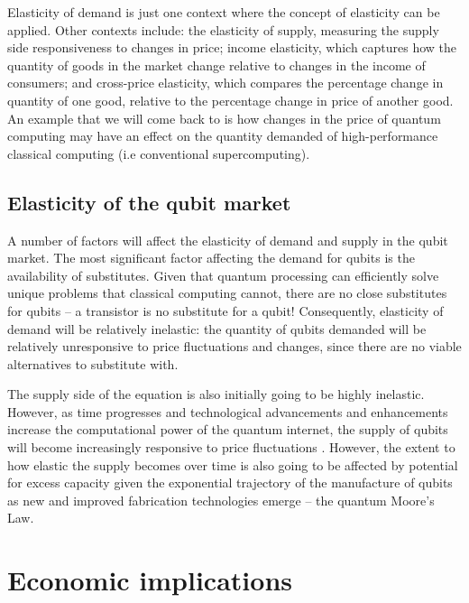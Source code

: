 Elasticity of demand is just one context where the concept of elasticity can be applied. Other contexts include: the elasticity of supply, measuring the supply side responsiveness to changes in price; income elasticity, which captures how the quantity of goods in the market change relative to changes in the income of consumers; and cross-price elasticity, which compares the percentage change in quantity of one good, relative to the percentage change in price of another good. An example that we will come back to is how changes in the price of quantum computing may have an effect on the quantity demanded of high-performance classical computing (i.e conventional supercomputing).

\subsection{Elasticity of the qubit market}

A number of factors will affect the elasticity of demand and supply in the qubit market. The most significant factor affecting the demand for qubits is the availability of substitutes. Given that quantum processing can efficiently solve unique problems that classical computing cannot, there are no close substitutes for qubits -- a transistor is no substitute for a qubit! Consequently, elasticity of demand will be relatively inelastic: the quantity of qubits demanded will be relatively unresponsive to price fluctuations and changes, since there are no viable alternatives to substitute with. 

The supply side of the equation is also initially going to be highly inelastic. However, as time progresses and technological advancements and enhancements increase the computational power of the quantum internet, the supply of qubits will become increasingly responsive to price fluctuations . However, the extent to how elastic the supply becomes over time is also going to be affected by potential for excess capacity given the exponential trajectory of the manufacture of qubits as new and improved fabrication technologies emerge -- the quantum Moore's Law.

%
%

\section{Economic implications}

